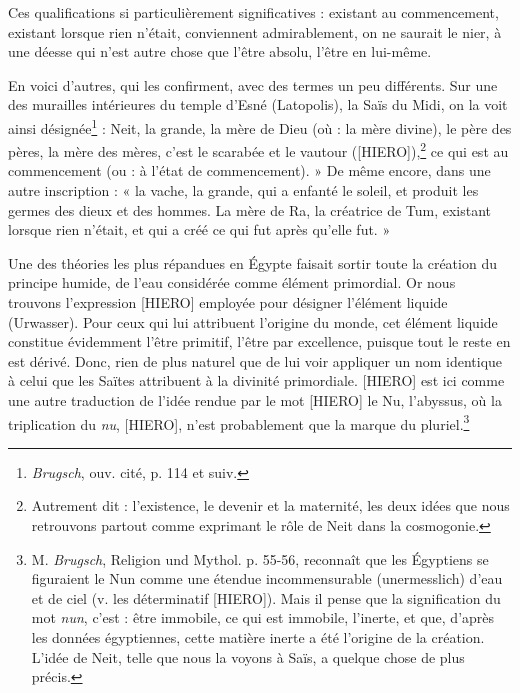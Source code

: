 \documentclass[a4paper, 11pt, oneside]{article}
\begin{document}
Ces qualifications si particulièrement significatives : existant au commencement, existant lorsque rien n'était, conviennent admirablement, on ne saurait le nier, à une déesse qui n'est autre chose que l'être absolu, l'être en lui-même.

En voici d'autres, qui les confirment, avec des termes un peu différents. Sur une des murailles intérieures du temple d'Esné (Latopolis), la Saïs du Midi, on la voit ainsi désignée\footnote{\emph{Brugsch}, ouv. cité, p. 114 et suiv.} : Neit, la grande, la mère de Dieu (où : la mère divine), le père des pères, la mère des mères, c'est le scarabée et le vautour ([HIERO]),\footnote{Autrement dit : l'existence, le devenir et la maternité, les deux idées que nous retrouvons partout comme exprimant le rôle de Neit dans la cosmogonie.} ce qui est au commencement (ou : à l'état de commencement). » De même encore, dans une autre inscription : « la vache, la grande, qui a enfanté le soleil, et produit les germes des dieux et des hommes. La mère de Ra, la créatrice de Tum, existant lorsque rien n'était, et qui a créé ce qui fut après qu'elle fut. »

Une des théories les plus répandues en Égypte faisait sortir toute la création du principe humide, de l'eau considérée comme élément primordial. Or nous trouvons l'expression [HIERO] employée pour désigner l'élément liquide (Urwasser). Pour ceux qui lui attribuent l'origine du monde, cet élément liquide constitue évidemment l'être primitif, l'être par excellence, puisque tout le reste en est dérivé. Donc, rien de plus naturel que de lui voir appliquer un nom identique à celui que les Saïtes attribuent à la divinité primordiale. [HIERO] est ici comme une autre traduction de l'idée rendue par le mot [HIERO] le Nu, l'abyssus, où la triplication du \emph{nu}, [HIERO], n'est probablement que la marque du pluriel.\footnote{M. \emph{Brugsch}, Religion und Mythol. p. 55-56, reconnaît que les Égyptiens se figuraient le Nun comme une étendue incommensurable (unermesslich) d'eau et de ciel (v. les déterminatif [HIERO]). Mais il pense que la signification du mot \emph{nun}, c'est : être immobile, ce qui est immobile, l'inerte, et que, d'après les données égyptiennes, cette matière inerte a été l'origine de la création. L'idée de Neit, telle que nous la voyons à Saïs, a quelque chose de plus précis.}
\end{document}
